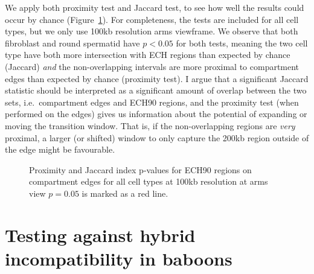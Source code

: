 \documentclass[
  11pt,
  a4paper,
]{scrbook}
\let\oldemph\emph
\renewcommand\emph[1]{\oldemph{\color{gray}#1}}
\begin{document}
We apply both proximity test and Jaccard test, to see how well the
results could occur by chance (Figure~\ref{fig-proximity-jaccard-bar}).
For completeness, the tests are included for all cell types, but we only
use 100kb resolution arms viewframe. We observe that both fibroblast and
round spermatid have \(p < 0.05\) for both tests, meaning the two cell
type have both more intersection with ECH regions than expected by
chance (Jaccard) \emph{and} the non-overlapping intervals are more
proximal to compartment edges than expected by chance (proximity test).
I argue that a significant Jaccard statistic should be interpreted as a
significant amount of overlap between the two sets, i.e.~compartment
edges and ECH90 regions, and the proximity test (when performed on the
edges) gives us information about the potential of expanding or moving
the transition window. That is, if the non-overlapping regions are
\emph{very} proximal, a larger (or shifted) window to only capture the
200kb region outside of the edge might be favourable.

\begin{figure}[H]


\caption{\label{fig-proximity-jaccard-bar}Proximity and Jaccard index
p-values for ECH90 regions on compartment edges for all cell types at
100kb resolution at arms view \(p=0.05\) is marked as a red line.}

\end{figure}%

\section{Testing against hybrid incompatibility in
baboons}\label{testing-against-hybrid-incompatibility-in-baboons}
\end{document}
